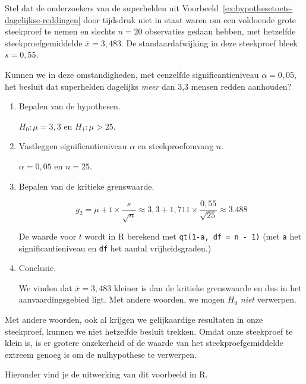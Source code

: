 \begin{example}
  \label{ex:t-toets-dagelijkse-reddingen}
  Stel dat de onderzoekers van de superhelden uit Voorbeeld~\ref{ex:hypothesetoets-dagelijkse-reddingen} door tijdsdruk niet in staat waren om een voldoende grote steekproef te nemen en slechts $n = 20$ observaties gedaan hebben, met hetzelfde steekproefgemiddelde $\overline{x} = 3,483$. De standaardafwijking in deze steekproef bleek $s = 0,55$.
  
  Kunnen we in deze omstandigheden, met eenzelfde significantieniveau $\alpha = 0,05$, het besluit dat superhelden dagelijks \emph{meer} dan 3,3 mensen redden aanhouden?
  
  \begin{enumerate}
    \item Bepalen van de hypothesen.
    
      $H_{0} : \mu = 3,3$ en $H_{1}: \mu > 25$.
    
    \item Vastleggen significantieniveau $\alpha$ en steekproefomvang $n$.
    
    $\alpha = 0,05$ en $n=25$.
    
    \item Bepalen van de kritieke grenswaarde.
    
    \[ g_{2} = \mu + t \times \frac{s}{\sqrt{n}} \approx 3,3 + 1,711 \times \frac{0,55}{\sqrt{25}} \approx 3.488 \]
    
    De waarde voor $t$ wordt in R berekend met \texttt{qt(1-a, df = n - 1)} (met \texttt{a} het significantieniveau en \texttt{df} het aantal vrijheidsgraden.)
    
    \item Conclusie.
    
    We vinden dat $\overline{x} = 3,483$ kleiner is dan de kritieke grenswaarde en dus in het aanvaardingsgebied ligt. Met andere woorden, we mogen $H_{0}$ \emph{niet} verwerpen.
  \end{enumerate}

  Met andere woorden, ook al krijgen we gelijkaardige resultaten in onze steekproef, kunnen we niet hetzelfde besluit trekken. Omdat onze steekproef te klein is, is er grotere onzekerheid of de waarde van het steekproefgemiddelde extreem genoeg is om de nulhypothese te verwerpen.
  
  Hieronder vind je de uitwerking van dit voorbeeld in R.
\end{example}



